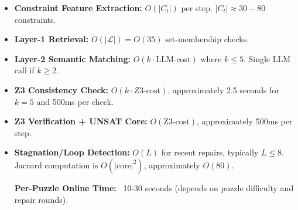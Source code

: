 \begin{itemize}
    \item \textbf{Constraint Feature Extraction:} $O(|C_t|)$ per step. $|C_t| \approx 30-80$ constraints.

    \item \textbf{Layer-1 Retrieval:} $O(|\mathcal{L}|) = O(35)$ set-membership checks.

    \item \textbf{Layer-2 Semantic Matching:} $O(k \cdot \text{LLM-cost})$ where $k \leq 5$. Single LLM call if $k \geq 2$.

    \item \textbf{Z3 Consistency Check:} $O(k \cdot Z3\text{-cost})$, approximately 2.5 seconds for $k=5$ and 500ms per check.

    \item \textbf{Z3 Verification + UNSAT Core:} $O(\text{Z3-cost})$, approximately 500ms per step.

    \item \textbf{Stagnation/Loop Detection:} $O(L)$ for recent repairs, typically $L \leq 8$. Jaccard computation is $O(|\text{core}|^2)$, approximately $O(80)$.

    \textbf{Per-Puzzle Online Time:} ~10-30 seconds (depends on puzzle difficulty and repair rounds).
\end{itemize}
